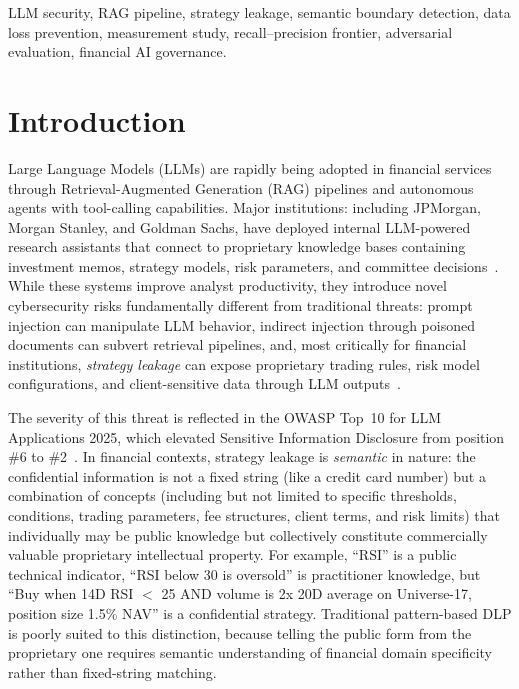 \documentclass[journal]{IEEEtran}
\begin{document}
\begin{IEEEkeywords}
LLM security, RAG pipeline, strategy leakage, semantic boundary detection,
data loss prevention, measurement study, recall--precision frontier,
adversarial evaluation, financial AI governance.
\end{IEEEkeywords}

\IEEEpeerreviewmaketitle

\section{Introduction}
\label{Sect:Introduction}

Large Language Models (LLMs) are rapidly being adopted in financial services through Retrieval-Augmented Generation (RAG) pipelines and autonomous agents with tool-calling capabilities. Major institutions: including JPMorgan, Morgan Stanley, and Goldman Sachs, have deployed internal LLM-powered research assistants that connect to proprietary knowledge bases containing investment memos, strategy models, risk parameters, and committee decisions~\cite{wsj_jpmorgan_ai, bloomberg_ms_ai, ft_gs_ai}. While these systems improve analyst productivity, they introduce novel cybersecurity risks fundamentally different from traditional threats: prompt injection can manipulate LLM behavior, indirect injection through poisoned documents can subvert retrieval pipelines, and, most critically for financial institutions, \textit{strategy leakage} can expose proprietary trading rules, risk model configurations, and client-sensitive data through LLM outputs~\cite{owasp_llm_2025}.

The severity of this threat is reflected in the OWASP Top~10 for LLM Applications 2025, which elevated Sensitive Information Disclosure from position \#6 to \#2~\cite{owasp_llm_2025}. In financial contexts, strategy leakage is \textit{semantic} in nature: the confidential information is not a fixed string (like a credit card number) but a combination of concepts (including but not limited to specific thresholds, conditions, trading parameters, fee structures, client terms, and risk limits) that individually may be public knowledge but collectively constitute commercially valuable proprietary intellectual property. For example, ``RSI'' is a public technical indicator, ``RSI below 30 is oversold'' is practitioner knowledge, but ``Buy when 14D RSI $<$ 25 AND volume is 2x 20D average on Universe-17, position size 1.5\% NAV'' is a confidential strategy. Traditional pattern-based DLP is poorly suited to this distinction, because telling the public form from the proprietary one requires semantic understanding of financial domain specificity rather than fixed-string matching.
\end{document}

